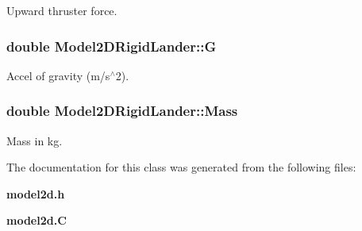 Upward thruster force.

\subsubsection{\setlength{\rightskip}{0pt plus 5cm}double Model2DRigid\-Lander::G}\label{classModel2DRigidLander_m1}


Accel of gravity (m/s$^\wedge$2).

\subsubsection{\setlength{\rightskip}{0pt plus 5cm}double Model2DRigid\-Lander::Mass}\label{classModel2DRigidLander_m0}


Mass in kg.



The documentation for this class was generated from the following files:\begin{CompactItemize}
\item 
{\bf model2d.h}\item 
{\bf model2d.C}\end{CompactItemize}
